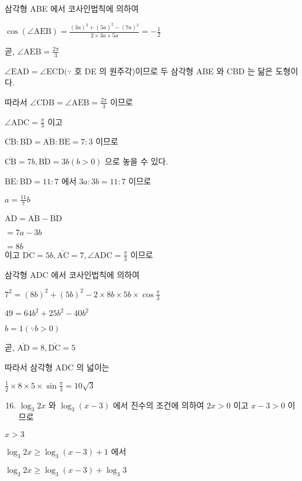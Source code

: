 \documentclass[10pt]{article}
\begin{document}
삼각형 ABE 에서 코사인법칙에 의하여

$\cos (\angle \mathrm{AEB})=\frac{(3 a)^{2}+(5 a)^{2}-(7 a)^{2}}{2 \times 3 a \times 5 a}=-\frac{1}{2}$

곧, $\angle \mathrm{AEB}=\frac{2 \pi}{3}$

$\angle \mathrm{EAD}=\angle \mathrm{ECD}(\because$ 호 DE 의 원주각)이므로 두 삼각형 ABE 와 CBD 는 닮은 도형이다.

따라서 $\angle \mathrm{CDB}=\angle \mathrm{AEB}=\frac{2 \pi}{3}$ 이므로

$\angle \mathrm{ADC}=\frac{\pi}{3}$ 이고

$\overline{\mathrm{CB}}: \overline{\mathrm{BD}}=\overline{\mathrm{AB}}: \overline{\mathrm{BE}}=7: 3$ 이므로

$\overline{\mathrm{CB}}=7 b, \overline{\mathrm{BD}}=3 b(b>0)$ 으로 놓을 수 있다.

$\overline{\mathrm{BE}}: \overline{\mathrm{BD}}=11: 7$ 에서 $3 a: 3 b=11: 7$ 이므로

$a=\frac{11}{7} b$

$\overline{\mathrm{AD}}=\overline{\mathrm{AB}}-\overline{\mathrm{BD}}$

$=7 a-3 b$

$=8 b$\\
이고 $\overline{\mathrm{DC}}=5 b, \overline{\mathrm{AC}}=7, \angle \mathrm{ADC}=\frac{\pi}{3}$ 이므로

삼각형 ADC 에서 코사인법칙에 의하여

$7^{2}=(8 b)^{2}+(5 b)^{2}-2 \times 8 b \times 5 b \times \cos \frac{\pi}{3}$

$49=64 b^{2}+25 b^{2}-40 b^{2}$

$b=1(\because b>0)$

곧, $\overline{\mathrm{AD}}=8, \overline{\mathrm{DC}}=5$

따라서 삼각형 ADC 의 넓이는

$\frac{1}{2} \times 8 \times 5 \times \sin \frac{\pi}{3}=10 \sqrt{3}$

\begin{enumerate}
  \setcounter{enumi}{15}
  \item $\log _{3} 2 x$ 와 $\log _{3}(x-3)$ 에서 진수의 조건에 의하여 $2 x>0$ 이고 $x-3>0$ 이므로
\end{enumerate}

$x>3$

$\log _{3} 2 x \geq \log _{3}(x-3)+1$ 에서

$\log _{3} 2 x \geq \log _{3}(x-3)+\log _{3} 3$
\end{document}
